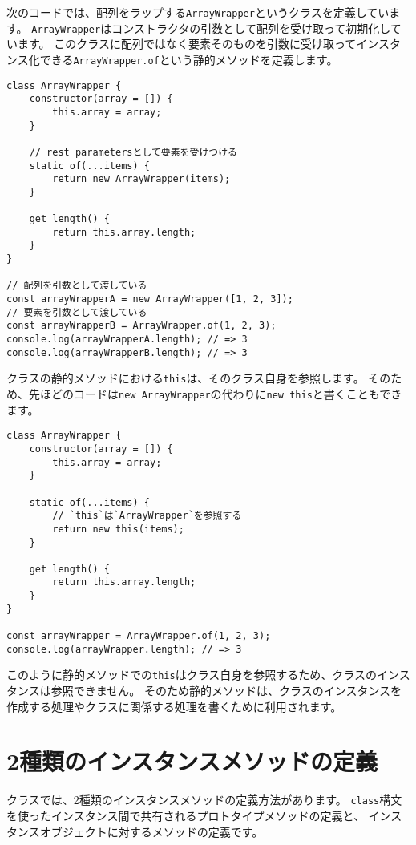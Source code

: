 次のコードでは、配列をラップする\texttt{ArrayWrapper}というクラスを定義しています。
\texttt{ArrayWrapper}はコンストラクタの引数として配列を受け取って初期化しています。
このクラスに配列ではなく要素そのものを引数に受け取ってインスタンス化できる\texttt{ArrayWrapper.of}という静的メソッドを定義します。

\begin{lstlisting}
class ArrayWrapper {
    constructor(array = []) {
        this.array = array;
    }

    // rest parametersとして要素を受けつける
    static of(...items) {
        return new ArrayWrapper(items);
    }

    get length() {
        return this.array.length;
    }
}

// 配列を引数として渡している
const arrayWrapperA = new ArrayWrapper([1, 2, 3]);
// 要素を引数として渡している
const arrayWrapperB = ArrayWrapper.of(1, 2, 3);
console.log(arrayWrapperA.length); // => 3
console.log(arrayWrapperB.length); // => 3
\end{lstlisting}

クラスの静的メソッドにおける\texttt{this}は、そのクラス自身を参照します。
そのため、先ほどのコードは\texttt{new ArrayWrapper}の代わりに\texttt{new this}と書くこともできます。

\begin{lstlisting}
class ArrayWrapper {
    constructor(array = []) {
        this.array = array;
    }

    static of(...items) {
        // `this`は`ArrayWrapper`を参照する
        return new this(items);
    }

    get length() {
        return this.array.length;
    }
}

const arrayWrapper = ArrayWrapper.of(1, 2, 3);
console.log(arrayWrapper.length); // => 3
\end{lstlisting}

このように静的メソッドでの\texttt{this}はクラス自身を参照するため、クラスのインスタンスは参照できません。
そのため静的メソッドは、クラスのインスタンスを作成する処理やクラスに関係する処理を書くために利用されます。

\hypertarget{two-instance-method-definition}{%
\section{2種類のインスタンスメソッドの定義}\label{two-instance-method-definition}}

クラスでは、2種類のインスタンスメソッドの定義方法があります。
\texttt{class}構文を使ったインスタンス間で共有されるプロトタイプメソッドの定義と、
インスタンスオブジェクトに対するメソッドの定義です。

